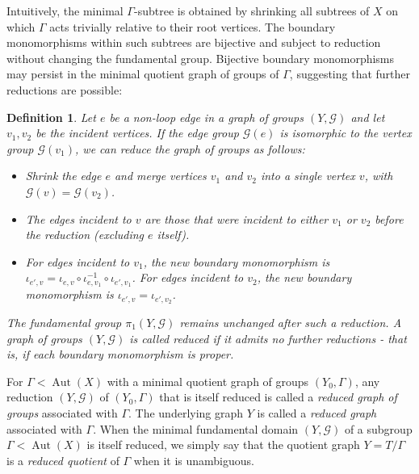 \documentclass[12pt,leqno]{amsart}
\newcommand{\2}{L^2_{\rm per}(0, T)}
\newtheorem{defn}{Definition}[section]
\newcommand{\aut}{{\operatorname{Aut}}}
\numberwithin{equation}{section}
\numberwithin{figure}{section}
\begin{document}
Intuitively, the minimal $\Gamma$-subtree is obtained by shrinking all subtrees of $X$ on which $\Gamma$ acts trivially relative to their root vertices. The boundary monomorphisms within such subtrees are bijective and subject to reduction without changing the fundamental group. Bijective boundary monomorphisms may persist in the minimal quotient graph of groups of $\Gamma$, suggesting that further reductions are possible:
\begin{defn}
    Let $e$ be a non-loop edge in a graph of groups $(Y, \mathcal{G})$ and let $v_1, v_2$ be the incident vertices. If the edge group $\mathcal{G}(e)$ is isomorphic to the vertex group $\mathcal{G}(v_1)$, we can reduce the graph of groups as follows:
    \begin{itemize}
        \item Shrink the edge $e$ and merge vertices $v_1$ and $v_2$ into a single vertex $v$, with $\mathcal{G}(v) = \mathcal{G}(v_2)$.
        \item The edges incident to $v$ are those that were incident to either $v_1$ or $v_2$ before the reduction (excluding $e$ itself).
        \item For edges incident to $v_1$, the new boundary monomorphism is $\iota_{e', v} = \iota_{e, v} \circ \iota_{e, v_1}^{-1} \circ \iota_{e', v_1}$. For edges incident to $v_2$, the new boundary monomorphism is $\iota_{e', v} = \iota_{e', v_2}$.
    \end{itemize}
    The fundamental group $\pi_1(Y, \mathcal{G})$ remains unchanged after such a reduction. A graph of groups $(Y, \mathcal{G})$ is called \emph{reduced} if it admits no further reductions - that is, if each boundary monomorphism is proper.
\end{defn}
For $\Gamma < \aut(X)$ with a minimal quotient graph of groups $(Y_0, \Gamma)$, any reduction $(Y, \mathcal{G})$ of $(Y_0, \Gamma)$ that is itself reduced is called a \emph{reduced graph of groups} associated with $\Gamma$. The underlying graph $Y$ is called a \emph{reduced graph} associated with $\Gamma$. When the minimal fundamental domain $(Y, \mathcal{G})$ of a subgroup $\Gamma < \aut(X)$ is itself reduced, we simply say that the quotient graph $Y = T/\Gamma$ is a \emph{reduced quotient} of $\Gamma$ when it is unambiguous.
\end{document}

